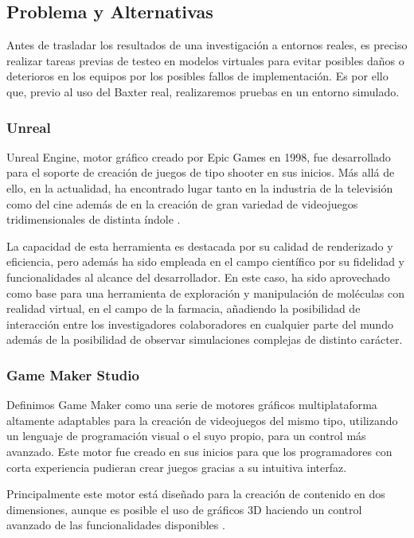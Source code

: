 \subsection{Problema y Alternativas}

Antes de trasladar los resultados de una investigación a entornos reales, es preciso realizar tareas previas de testeo en modelos virtuales para evitar posibles daños o deterioros en los equipos por los posibles fallos de implementación. Es por ello que, previo al uso del Baxter real, realizaremos pruebas en un entorno simulado.


\subsubsection{Unreal}

Unreal Engine, motor gráfico creado por Epic Games en 1998, fue desarrollado para el soporte de creación de juegos de tipo shooter en sus inicios. Más allá de ello, en la actualidad, ha encontrado lugar tanto en la industria de la televisión como del cine además de en la creación de gran variedad de videojuegos tridimensionales de distinta índole \cite{50}.

La capacidad de esta herramienta es destacada por su calidad de renderizado y eficiencia, pero además ha sido empleada en el campo científico por su fidelidad y funcionalidades al alcance del desarrollador. En este caso, ha sido aprovechado como base para una herramienta de exploración y manipulación de moléculas con realidad virtual, en el campo de la farmacia, añadiendo la posibilidad de interacción entre los investigadores colaboradores en cualquier parte del mundo además de la posibilidad de observar simulaciones complejas de distinto carácter\cite{51}.

\subsubsection{Game Maker Studio}

Definimos Game Maker como una serie de motores gráficos multiplataforma altamente adaptables para la creación de videojuegos del mismo tipo, utilizando un lenguaje de programación visual o el suyo propio, para un control más avanzado. Este motor fue creado en sus inicios para que los programadores con corta experiencia pudieran crear juegos gracias a su intuitiva interfaz.

Principalmente este motor está diseñado para la creación de contenido en dos dimensiones, aunque es posible el uso de gráficos 3D haciendo un control avanzado de las funcionalidades disponibles \cite{52}.

